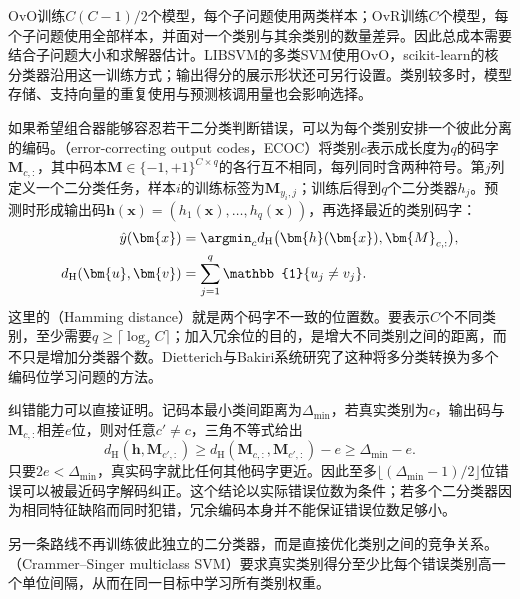 OvO训练$C(C-1)/2$个模型，每个子问题使用两类样本；OvR训练$C$个模型，每个子问题使用全部样本，并面对一个类别与其余类别的数量差异。因此总成本需要结合子问题大小和求解器估计。LIBSVM的多类SVM使用OvO，scikit-learn的核分类器沿用这一训练方式；输出得分的展示形状还可另行设置。类别较多时，模型存储、支持向量的重复使用与预测核调用量也会影响选择。

如果希望组合器能够容忍若干二分类判断错误，可以为每个类别安排一个彼此分离的编码。（error-correcting output codes，ECOC）将类别$c$表示成长度为$q$的码字$\bm{M}_{c,:}$，其中码本$\bm{M}\in\{-1,+1\}^{C\times q}$的各行互不相同，每列同时含两种符号。第$j$列定义一个二分类任务，样本$i$的训练标签为$\bm{M}_{y_i,j}$；训练后得到$q$个二分类器$h_j$。预测时形成输出码$\bm{h}(\bm{x})=(h_1(\bm{x}),\ldots,h_q(\bm{x}))$，再选择最近的类别码字：
\begin{equation}
  \begin{aligned}
    \hat y(\bm{x})
      &=\argmin_c d_{\mathrm{H}}
          \bigl(\bm{h}(\bm{x}),\bm{M}_{c,:}\bigr),\\
    d_{\mathrm{H}}(\bm{u},\bm{v})
      &=\sum_{j=1}^q\mathbb{1}\{u_j\ne v_j\}.
  \end{aligned}
  \label{eq:classification-svm-ecoc}
\end{equation}
这里的（Hamming distance）就是两个码字不一致的位置数。要表示$C$个不同类别，至少需要$q\ge\lceil\log_2 C\rceil$；加入冗余位的目的，是增大不同类别之间的距离，而不只是增加分类器个数。Dietterich与Bakiri系统研究了这种将多分类转换为多个编码位学习问题的方法。

纠错能力可以直接证明。记码本最小类间距离为$\Delta_{\min}$，若真实类别为$c$，输出码与$\bm{M}_{c,:}$相差$e$位，则对任意$c'\ne c$，三角不等式给出
\[
  d_{\mathrm{H}}(\bm{h},\bm{M}_{c',:})
  \ge d_{\mathrm{H}}(\bm{M}_{c,:},\bm{M}_{c',:})-e
  \ge\Delta_{\min}-e.
\]
只要$2e<\Delta_{\min}$，真实码字就比任何其他码字更近。因此至多$\lfloor(\Delta_{\min}-1)/2\rfloor$位错误可以被最近码字解码纠正。这个结论以实际错误位数为条件；若多个二分类器因为相同特征缺陷而同时犯错，冗余编码本身并不能保证错误位数足够小。

另一条路线不再训练彼此独立的二分类器，而是直接优化类别之间的竞争关系。（Crammer--Singer multiclass SVM）要求真实类别得分至少比每个错误类别高一个单位间隔，从而在同一目标中学习所有类别权重。

